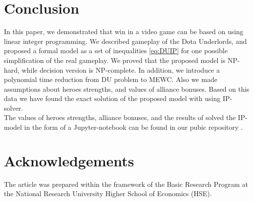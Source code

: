 \documentclass[smallextended]{svjour3}       %
\begin{document}
\section{Conclusion}
\label{SectionConclusion}
In this paper, we demonstrated that win in a video game can be based on using linear integer programming.
We described gameplay of the Dota Underlords, and proposed a formal model as a set of inequalities \eqref{eq:DUIP} for one possible simplification of the real gameplay.
We proved that the proposed model is NP-hard, while decision version is NP-complete. In addition, we introduce a polynomial time reduction from DU problem to MEWC.
Also we made assumptions about heroes strengths, and values of alliance bonuses.
Based on this data we have found the exact solution of the proposed model with using IP-solver. \\
The values of heroes  strengths, alliance bonuses, and  the results of solved the IP-model in the form of a Jupyter-notebook can be found in our pubic repository \cite{UnderLordsInput}.
\section{Acknowledgements}
The article was prepared within the framework of the Basic Research Program at the National Research University Higher School of Economics (HSE).



\end{document}
